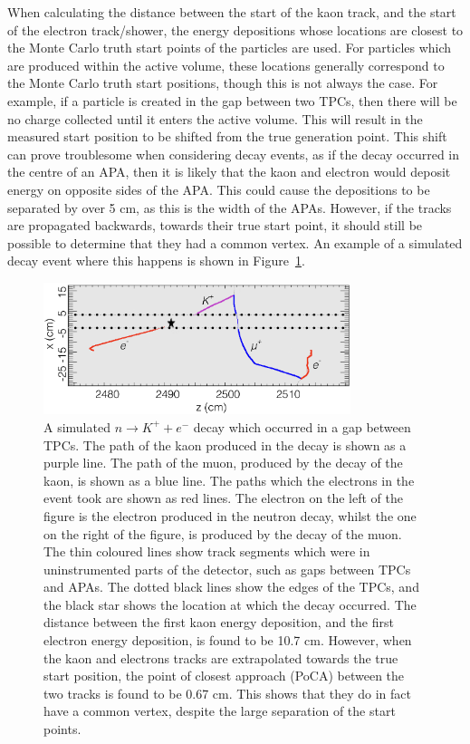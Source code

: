 When calculating the distance between the start of the kaon track, and the start of the electron track/shower, the energy depositions whose locations are closest to the Monte Carlo truth start points of the particles are used. For particles which are produced within the active volume, these locations generally correspond to the Monte Carlo truth start positions, though this is not always the case. For example, if a particle is created in the gap between two TPCs, then there will be no charge collected until it enters the active volume. This will result in the measured start position to be shifted from the true generation point. This shift can prove troublesome when considering decay events, as if the decay occurred in the centre of an APA, then it is likely that the kaon and electron would deposit energy on opposite sides of the APA. This could cause the depositions to be separated by over 5 cm, as this is the width of the APAs. However, if the tracks are propagated backwards, towards their true start point, it should still be possible to determine that they had a common vertex. An example of a simulated decay event where this happens is shown in Figure~\ref{fig:NDK_Sig_KEBigGap}. \\

\begin{figure}
  \centering
  \includegraphics[width=0.8\textwidth]{KaonElecBigGap}
  \caption[A simulated $n \rightarrow K^{+} + e^{-}$ decay which occurred in a gap between TPCs]
          {A simulated $n \rightarrow K^{+} + e^{-}$ decay which occurred in a gap between TPCs. The path of the kaon produced in the decay is shown as a purple line. The path of the muon, produced by the decay of the kaon, is shown as a blue line. The paths which the electrons in the event took are shown as red lines. The electron on the left of the figure is the electron produced in the neutron decay, whilst the one on the right of the figure, is produced by the decay of the muon. The thin coloured lines show track segments which were in uninstrumented parts of the detector, such as gaps between TPCs and APAs. The dotted black lines show the edges of the TPCs, and the black star shows the location at which the decay occurred. The distance between the first kaon energy deposition, and the first electron energy deposition, is found to be 10.7 cm. However, when the kaon and electrons tracks are extrapolated towards the true start position, the point of closest approach (PoCA) between the two tracks is found to be 0.67 cm. This shows that they do in fact have a common vertex, despite the large separation of the start points.} 
  \label{fig:NDK_Sig_KEBigGap}
\end{figure}

